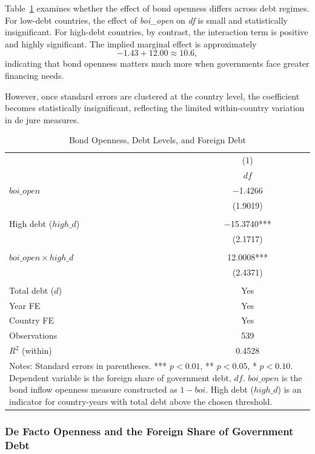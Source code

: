 \documentclass[\latexroot/\projectname]{subfiles}
\begin{document}
Table~\ref{tab:interaction} examines whether the effect of bond openness differs across debt regimes. For low-debt countries, the effect of \textit{boi\_open} on \textit{df} is small and statistically insignificant. For high-debt countries, by contrast, the interaction term is positive and highly significant. The implied marginal effect is approximately
\[
-1.43 + 12.00 \approx 10.6,
\]
indicating that bond openness matters much more when governments face greater financing needs.

However, once standard errors are clustered at the country level, the coefficient becomes statistically insignificant, reflecting the limited within-country variation in de jure measures.

\begin{table}[htbp]
\centering
\caption{Bond Openness, Debt Levels, and Foreign Debt}
\label{tab:interaction}
\begin{tabular}{lc}
\toprule
 & (1) \\
 & $df$ \\
\midrule
$boi\_open$ 
    & $-$1.4266 \\
    & (1.9019) \\
\\
High debt ($high\_d$)
    & $-$15.3740*** \\
    & (2.1717) \\
\\
$boi\_open \times high\_d$
    & 12.0008*** \\
    & (2.4371) \\
\\
Total debt ($d$)
    & Yes \\
Year FE
    & Yes \\
Country FE
    & Yes \\
\midrule
Observations
    & 539 \\
$R^2$ (within)
    & 0.4528 \\
\bottomrule
\multicolumn{2}{p{0.85\linewidth}}{\footnotesize Notes: Standard errors in parentheses. *** $p<0.01$, ** $p<0.05$, * $p<0.10$. Dependent variable is the foreign share of government debt, $df$. $boi\_open$ is the bond inflow openness measure constructed as $1-boi$. High debt ($high\_d$) is an indicator for country-years with total debt above the chosen threshold.}
\end{tabular}
\end{table}

\subsubsection{De Facto Openness and the Foreign Share of Government Debt}
\end{document}
